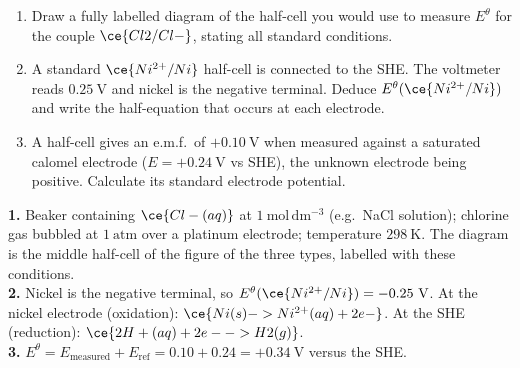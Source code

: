 \documentclass[11pt]{article}
\begin{document}
\begin{exercice}
\begin{enumerate}
\item Draw a fully labelled diagram of the half-cell you would use to measure $E^{\theta}$ for the couple $\ce{Cl2/Cl-}$, stating all standard conditions.
\item A standard $\ce{Ni^{2+}/Ni}$ half-cell is connected to the SHE. The voltmeter reads $0.25\ \mathrm{V}$ and nickel is the negative terminal. Deduce $E^{\theta}(\ce{Ni^{2+}/Ni})$ and write the half-equation that occurs at each electrode.
\item A half-cell gives an e.m.f.\ of $+0.10\ \mathrm{V}$ when measured against a saturated calomel electrode ($E = +0.24\ \mathrm{V}$ vs SHE), the unknown electrode being positive. Calculate its standard electrode potential.
\end{enumerate}
\end{exercice}

\begin{corrige}[Exercise 1]
\textbf{1.} Beaker containing $\ce{Cl-(aq)}$ at $1\ \mathrm{mol\,dm^{-3}}$ (e.g.\ NaCl solution); chlorine gas bubbled at $1\ \mathrm{atm}$ over a platinum electrode; temperature $298\ \mathrm{K}$. The diagram is the middle half-cell of the figure of the three types, labelled with these conditions.\\
\textbf{2.} Nickel is the negative terminal, so $E^{\theta}(\ce{Ni^{2+}/Ni}) = -0.25\ \mathrm{V}$. At the nickel electrode (oxidation): $\ce{Ni(s) -> Ni^{2+}(aq) + 2e-}$. At the SHE (reduction): $\ce{2H+(aq) + 2e- -> H2(g)}$.\\
\textbf{3.} $E^{\theta} = E_{\text{measured}} + E_{\text{ref}} = 0.10 + 0.24 = +0.34\ \mathrm{V}$ versus the SHE.
\end{corrige}
\end{document}
